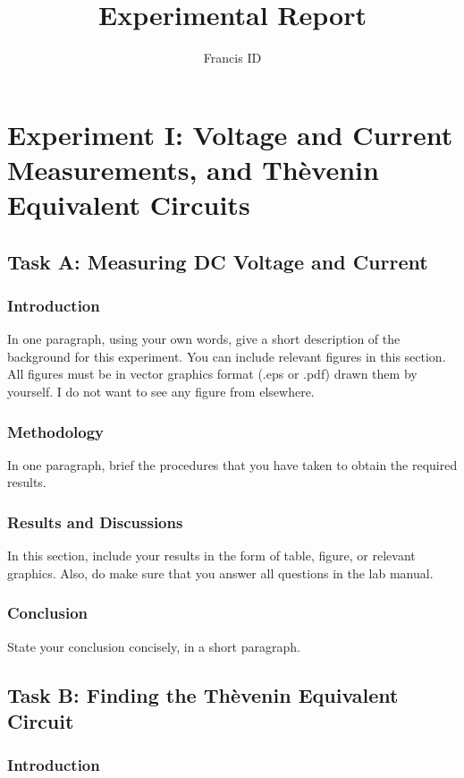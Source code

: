 \documentclass{article}
\title{Experimental Report}
\author{Francis  ID}
\begin{document}
\maketitle
\tableofcontents

\section{Experiment I: Voltage and Current Measurements, and Th\`{e}venin Equivalent Circuits}

\subsection{Task A: Measuring DC Voltage and Current}
   \subsubsection{Introduction}

In one paragraph, using your own words, give a short description of the background for this experiment.  You can include relevant figures in this section.  All figures must be in vector graphics format (.eps or .pdf) drawn them by yourself.  I do not want to see any figure from elsewhere. 

\subsubsection{Methodology}
In one paragraph, brief the procedures that you have taken to obtain the required results. 

\subsubsection{Results and Discussions}
In this section, include your results in the form of table, figure, or relevant graphics.  Also, do make sure that you answer all questions in the lab manual. 

\subsubsection{Conclusion}
State your conclusion concisely, in a short paragraph.

\subsection{Task B: Finding the Th\`{e}venin Equivalent Circuit}
\subsubsection{Introduction}
\end{document}
